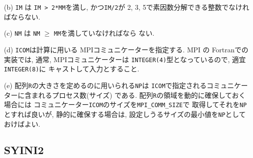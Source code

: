 \documentclass[a4j]{jsarticle}
\begin{document}
\begin{enumerate}
(b) \texttt{IM} は \texttt{IM > 2*MM}を満し, かつ\texttt{IM/2}が
2, 3, 5で素因数分解できる整数でなければならない.

(c) \texttt{NM} は \texttt{NM} $\ge$ \texttt{MM}を満していなければなら
ない.

(d) \texttt{ICOM}は計算に用いる MPIコミュニケーターを指定する.
MPI の Fortranでの実装では, 通常, MPIコミュニケーターは
\texttt{INTEGER(4)}型となっているので, 適宜\texttt{INTEGER(8)}に
キャストして入力とすること.

(e) 配列\texttt{R}の大きさを定めるのに用いられる\texttt{NP}は
\texttt{ICOM}で指定されるコミュニケーターに含まれるプロセス数(サイズ)
である. 配列\texttt{R}の領域を動的に確保しておく場合には
コミュニケーター\texttt{ICOM}のサイズを\texttt{MPI\_COMM\_SIZE}で
取得してそれを\texttt{NP}とすれば良いが, 静的に確保する場合は,
設定しうるサイズの最小値を\texttt{NP}としておけばよい.

\end{enumerate}


\subsection{SYINI2}
\end{document}
